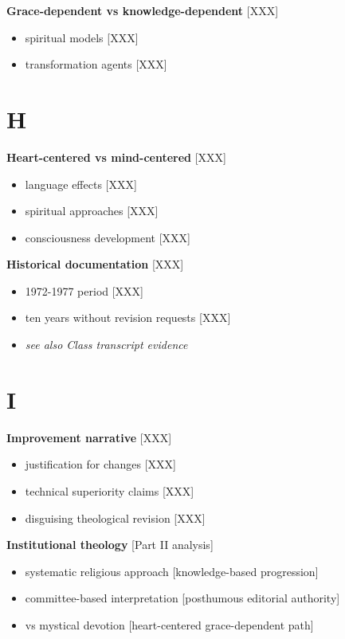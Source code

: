 \documentclass[11pt,twoside]{book}
\begin{document}
\textbf{\textbf{Grace-dependent vs knowledge-dependent}} {[}XXX]
\begin{itemize}
\item spiritual models [XXX]
\item transformation agents [XXX]
\end{itemize}
\section*{H}
\label{sec:org1f96c96}

\textbf{\textbf{Heart-centered vs mind-centered}} {[}XXX]
\begin{itemize}
\item language effects [XXX]
\item spiritual approaches [XXX]
\item consciousness development [XXX]
\end{itemize}

\textbf{\textbf{Historical documentation}} {[}XXX]
\begin{itemize}
\item 1972-1977 period [XXX]
\item ten years without revision requests [XXX]
\item \emph{see also Class transcript evidence}
\end{itemize}
\section*{I}
\label{sec:org5f94d08}

\textbf{\textbf{Improvement narrative}} {[}XXX]
\begin{itemize}
\item justification for changes [XXX]
\item technical superiority claims [XXX]
\item disguising theological revision [XXX]
\end{itemize}

\textbf{\textbf{Institutional theology}} {[}Part II analysis]
\begin{itemize}
\item systematic religious approach [knowledge-based progression]
\item committee-based interpretation [posthumous editorial authority]
\item vs mystical devotion [heart-centered grace-dependent path]
\end{itemize}
\end{document}
